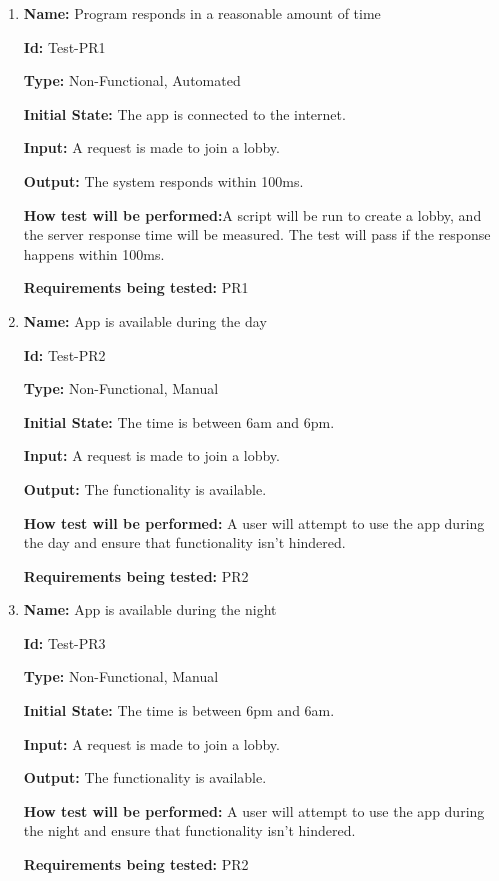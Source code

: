\documentclass[12pt, titlepage]{article}
\begin{document}
\begin{enumerate}

\item{\textbf{Name:} Program responds in a reasonable amount of time}

\textbf{Id:} Test-PR1

\textbf{Type:} Non-Functional, Automated
					
\textbf{Initial State:} The app is connected to the internet. 
					
\textbf{Input:} A request is made to join a lobby.  
					
\textbf{Output:} The system responds within 100ms.
					
\textbf{How test will be performed:}A script will be run to create a lobby, and the server response time will be measured. The test will pass if the response happens within 100ms.

\textbf{Requirements being tested:} PR1

\item{\textbf{Name:} App is available during the day}

\textbf{Id:} Test-PR2

\textbf{Type:} Non-Functional, Manual
					
\textbf{Initial State:} The time is between 6am and 6pm. 
					
\textbf{Input:} A request is made to join a lobby.  
					
\textbf{Output:} The functionality is available. 
					
\textbf{How test will be performed:} A user will attempt to use the app during the day and ensure that functionality isn't hindered. 

\textbf{Requirements being tested:} PR2

\item{\textbf{Name:} App is available during the night}

\textbf{Id:} Test-PR3

\textbf{Type:} Non-Functional, Manual
					
\textbf{Initial State:} The time is between 6pm and 6am. 
					
\textbf{Input:} A request is made to join a lobby.  
					
\textbf{Output:} The functionality is available. 
					
\textbf{How test will be performed:} A user will attempt to use the app during the night and ensure that functionality isn't hindered. 

\textbf{Requirements being tested:} PR2

\end{enumerate}
\end{document}
